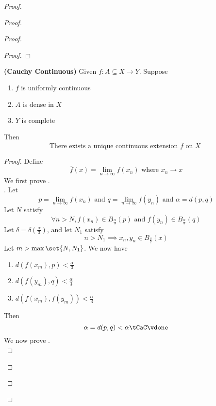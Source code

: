 \documentclass{report}
\begin{document}
\begin{proof}
\begin{proof}
\begin{proof}
\begin{proof}
\end{proof}
\begin{theorem}
\label{5.3.9}
\textbf{(Cauchy Continuous)} Given $f:A\subseteq X\rightarrow Y$. Suppose 
\begin{enumerate}[label=(\alph*)]
  \item $f$ is uniformly continuous
  \item $A$ is dense in  $X$ 
  \item $Y$ is complete
\end{enumerate}
Then
\begin{equation*}
\text{ There exists a unique continuous extension $\overline{f}$ on $X$ }
\end{equation*}
\end{theorem}
\begin{proof}
Define 
\begin{equation*}
\overline{f}(x)=\lim_{n\to \infty}f(x_n)\text{ where $x_n\to x$}
\end{equation*}
We first prove  .\\

. Let 
 \begin{equation*}
p=\lim_{n\to\infty}f(x_n)\text{ and }q=\lim_{n\to\infty}f(y_n)\text{ and }\alpha =d(p,q)
\end{equation*}
Let $N$ satisfy 
 \begin{equation*}
\forall n>N, f(x_n)\in B_{\frac{\alpha}{3}}(p)\text{ and }f(y_n)\in B_{\frac{\alpha}{3}}(q)
\end{equation*}
Let $\delta=\delta(\frac{\alpha}{3})$, and let $N_1$ satisfy 
 \begin{equation*}
n>N_1\implies x_n,y_n\in B_{\frac{\delta}{2}}(x)
\end{equation*}
Let $m>\max \set{N,N_1}$. We now have
\begin{enumerate}[label=(\alph*)]
  \item $d(f(x_m),p)<\frac{\alpha}{3}$ 
  \item $d(f(y_m),q)<\frac{\alpha}{3}$ 
  \item $d(f(x_m),f(y_m))<\frac{\alpha}{3}$
\end{enumerate}
Then 
\begin{equation*}
\alpha =d(p,q)<\alpha \tCaC \vdone
\end{equation*}
We now prove .\\


\end{proof}
\end{proof}
\end{proof}
\end{proof}
\end{document}
